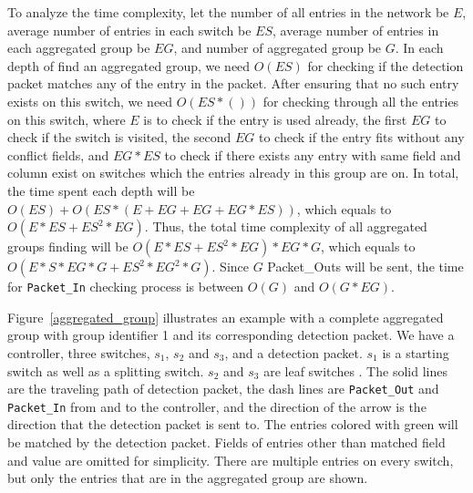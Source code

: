To analyze the time complexity, let the number of all entries in the network be $E$, average number of entries in each switch be $ES$, average number of entries in each aggregated group be $EG$, and number of aggregated group be $G$. In each depth of find an aggregated group, we need $O(ES)$ for checking if the detection packet matches any of the entry in the packet. After ensuring that no such entry exists on this switch, we need $O(ES * ())$  for checking through all the entries on this switch, where $E$ is to check if the entry is used already, the first $EG$ to check if the switch is visited, the second $EG$ to check if the entry fits without any conflict fields, and $EG*ES$ to check if there exists any entry with same field and column exist on switches which the entries already in this group are on. In total, the time spent each depth will be $O(ES) + O(ES* (E+EG+EG+EG*ES) )$, which equals to $O(E*ES + ES^2*EG)$. Thus, the total time complexity of all aggregated groups finding will be $O(E*ES + ES^2*EG) * EG * G$, which equals to $O(E*S*EG*G + ES^2*EG^2*G)$. Since $G$ Packet\_Outs will be sent, the time for \texttt{Packet\_In} checking process is between $O(G)$ and $O(G*EG)$.

Figure~\ref{aggregated_group} illustrates an example with a complete aggregated group with group identifier 1 and its corresponding detection packet. We have a controller, three switches, $s_1$, $s_2$ and $s_3$, and a detection packet. $s_1$ is a starting switch as well as a splitting switch. $s_2$ and $s_3$ are leaf switches \sout{}. The solid lines are the traveling path of detection packet, the dash lines are \texttt{Packet\_Out} and \texttt{Packet\_In} from and to the controller, and the direction of the arrow is the direction that the detection packet is sent to. The entries colored with green will be matched by the detection packet. Fields of entries other than matched field and value are omitted for simplicity. There are multiple entries on every switch, but only the entries that are in the aggregated group are shown\sout{}.

